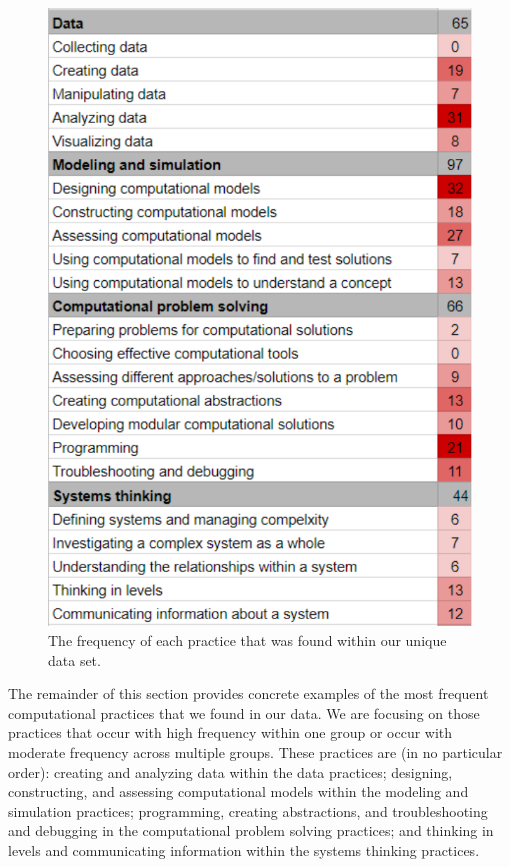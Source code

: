 \documentclass{msuphddissertation}
\begin{document}
\begin{doublespace}
\begin{figure}\centering
\includegraphics[scale=0.65]{./images/CH5DensityPlot.pdf}
\caption{The frequency of each practice that was found within our unique data set.}\label{CH5:DensityPlot}
\end{figure}

The remainder of this section provides concrete examples of the most frequent computational practices that we found in our data.  We are focusing on those practices that occur with high frequency within one group or occur with moderate frequency across multiple groups.  These practices are (in no particular order): creating and analyzing data within the data practices; designing, constructing, and assessing computational models within the modeling and simulation practices; programming, creating abstractions, and troubleshooting and debugging in the computational problem solving practices; and thinking in levels and communicating information within the systems thinking practices.


\end{doublespace}
\end{document}
